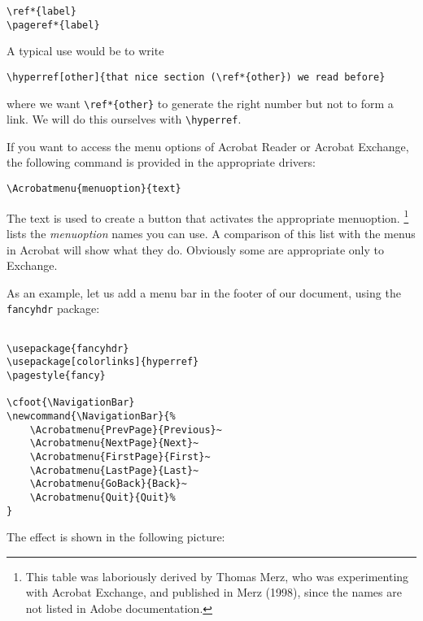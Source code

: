 
\begin{verbatim}
\ref*{label} 
\pageref*{label} 
\end{verbatim}

A typical use would be to write 

\begin{verbatim}
\hyperref[other]{that nice section (\ref*{other}) we read before} 
\end{verbatim}

where we want \verb|\ref*{other}| to generate the right number but not to form a link. 
We will do this ourselves with \verb|\hyperref|. 


If you want to access the menu options of Acrobat Reader or Acrobat Exchange, 
the following command is provided in the appropriate drivers: 

\begin{verbatim}
\Acrobatmenu{menuoption}{text} 
\end{verbatim}

The text is used to create a button that activates the appropriate
menuoption.  \footnote{ This table was laboriously derived by
Thomas Merz, who was experimenting with Acrobat Exchange, and published
in Merz (1998), since the names are not listed in Adobe documentation. } 
lists the \emph{menuoption} names you can use. A
comparison of this list with the menus in Acrobat will show what they
do. Obviously some are appropriate only to Exchange. 

As an example, let us add a menu bar in the footer of our document, using the 
\verb|fancyhdr| package: 

\begin{verbatim}

\usepackage{fancyhdr} 
\usepackage[colorlinks]{hyperref} 
\pagestyle{fancy} 

\cfoot{\NavigationBar} 
\newcommand{\NavigationBar}{% 
    \Acrobatmenu{PrevPage}{Previous}~ 
    \Acrobatmenu{NextPage}{Next}~ 
    \Acrobatmenu{FirstPage}{First}~ 
    \Acrobatmenu{LastPage}{Last}~ 
    \Acrobatmenu{GoBack}{Back}~ 
    \Acrobatmenu{Quit}{Quit}% 
} 

\end{verbatim}

The effect is shown in the following picture:
 

